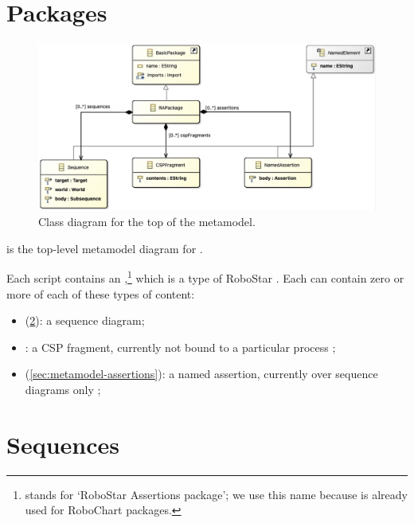 
\section{Packages}\label{sec:metamodel-top}

\begin{figure}
	\centering
	\includegraphics[width=.85\textwidth]{diagrams/top.png}
	\caption{Class diagram for the top of the \langname{} metamodel.}
	\label{fig:metamodel-top}
\end{figure}

 is the top-level metamodel diagram for \langname.

Each \langname{} script contains an \mrapackage,\footnote{\mrapackage{} stands
for `RoboStar Assertions package'; we use this name because \mrcpackage{} is
already used for RoboChart packages.}
which is a type of RoboStar \mbasicpackage.
Each \mrapackage{} can contain zero or more of each of these types of content:

\begin{itemize}
\item
	\msequence{}
	(\cref{sec:metamodel-sequences}):
	a sequence diagram;
\item
	\mcspfragment:
	a CSP fragment, currently not bound to a particular process
	;
\item
	\mnamedassertion{}
	(\cref{sec:metamodel-assertions}):
	a named assertion, currently over sequence diagrams only
	;
\end{itemize}



\section{Sequences}\label{sec:metamodel-sequences}

